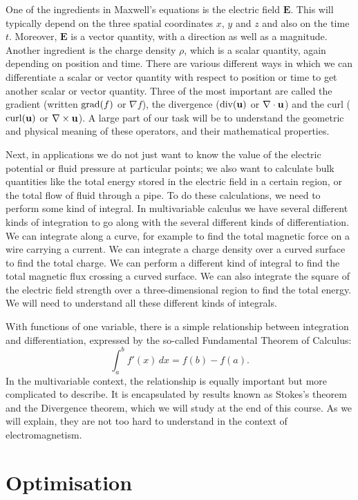 \documentclass[reqno]{amsart}
\theoremstyle{definition}
\begin{document}
One of the ingredients in Maxwell's equations is the electric field
$\mathbf{E}$.  This will typically depend on the three spatial
coordinates $x$, $y$ and $z$ and also on the time $t$.  Moreover,
$\mathbf{E}$ is a vector quantity, with a direction as well as a
magnitude.  Another ingredient is the charge density $\rho$, which is
a scalar quantity, again depending on position and time.  There are
various different ways in which we can differentiate a scalar or
vector quantity with respect to position or time to get another scalar
or vector quantity.  Three of the most important are called the
gradient (written $\operatorname{grad}(f)$ or $\nabla f$), the divergence
($\operatorname{div}(\mathbf{u})$ or $\nabla\cdot\mathbf{u}$) and the curl ($\operatorname{curl}(\mathbf{u})$ or
$\nabla\times\mathbf{u}$).  A large part of our task will be to understand the
geometric and physical meaning of these operators, and their
mathematical properties.

Next, in applications we do not just want to know the value of the
electric potential or fluid pressure at particular points; we also
want to calculate bulk quantities like the total energy stored in the 
electric field in a certain region, or the total flow of fluid through
a pipe.  To do these calculations, we need to perform some kind of
integral.  In multivariable calculus we have several different kinds
of integration to go along with the several different kinds of
differentiation.  We can integrate along a curve, for example to find
the total magnetic force on a wire carrying a current.  We can
integrate a charge density over a curved surface to find the total
charge.  We can perform a different kind of integral to find the total
magnetic flux crossing a curved surface.  We can also integrate the
square of the electric field strength over a three-dimensional region
to find the total energy.  We will need to understand all these
different kinds of integrals.

With functions of one variable, there is a simple relationship between
integration and differentiation, expressed by the so-called
Fundamental Theorem of Calculus:
\[ \int_a^b f'(x)\,dx = f(b) - f(a). \]
In the multivariable context, the relationship is equally important
but more complicated to describe.  It is encapsulated by results known
as Stokes's theorem and the Divergence theorem, which we will study at
the end of this course.  As we will explain, they are not too hard to
understand in the context of electromagnetism.

\section{Optimisation}
\label{sec-optimisation}
\end{document}
